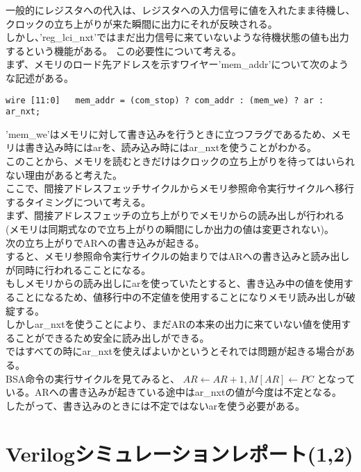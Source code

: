 \documentclass{jsarticle}
\begin{document}
一般的にレジスタへの代入は、レジスタへの入力信号に値を入れたまま待機し、クロックの立ち上がりが来た瞬間に出力にそれが反映される。\\
しかし、'reg\_lci\_nxt'ではまだ出力信号に来ていないような待機状態の値も出力するという機能がある。 この必要性について考える。\\

まず、メモリのロード先アドレスを示すワイヤー'mem\_addr'について次のような記述がある。
\begin{lstlisting}
wire [11:0]   mem_addr = (com_stop) ? com_addr : (mem_we) ? ar : ar_nxt;
\end{lstlisting}
'mem\_we'はメモリに対して書き込みを行うときに立つフラグであるため、メモリは書き込み時にはarを、読み込み時にはar\_nxtを使うことがわかる。\\
このことから、メモリを読むときだけはクロックの立ち上がりを待ってはいられない理由があると考えた。\\

ここで、間接アドレスフェッチサイクルからメモリ参照命令実行サイクルへ移行するタイミングについて考える。\\
まず、間接アドレスフェッチの立ち上がりでメモリからの読み出しが行われる(メモリは同期式なので立ち上がりの瞬間にしか出力の値は変更されない)。\\
次の立ち上がりでARへの書き込みが起きる。\\
すると、メモリ参照命令実行サイクルの始まりではARへの書き込みと読み出しが同時に行われるこことになる。\\
もしメモリからの読み出しにarを使っていたとすると、書き込み中の値を使用することになるため、値移行中の不定値を使用することになりメモリ読み出しが破綻する。\\
しかしar\_nxtを使うことにより、まだARの本来の出力に来ていない値を使用することができるため安全に読み出しができる。\\

ではすべての時にar\_nxtを使えばよいかというとそれでは問題が起きる場合がある。\\
BSA命令の実行サイクルを見てみると、
$AR \leftarrow AR + 1, M[AR] \leftarrow PC$
となっている。ARへの書き込みが起きている途中はar\_nxtの値が今度は不定となる。\\
したがって、書き込みのときには不定ではないarを使う必要がある。

\section*{Verilogシミュレーションレポート(1,2)}
\end{document}
